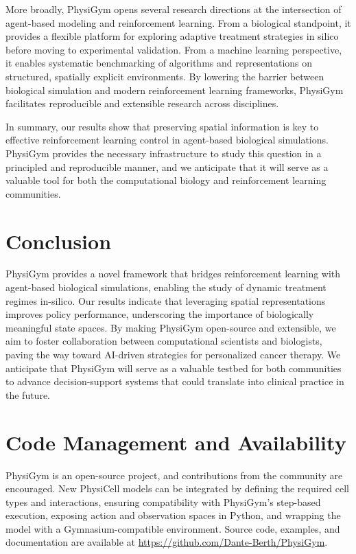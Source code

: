 \documentclass{article}
\begin{document}
More broadly, PhysiGym opens several research directions at the intersection of agent-based modeling and reinforcement learning. From a biological standpoint, it provides a flexible platform for exploring adaptive treatment strategies in silico before moving to experimental validation. From a machine learning perspective, it enables systematic benchmarking of algorithms and representations on structured, spatially explicit environments. By lowering the barrier between biological simulation and modern reinforcement learning frameworks, PhysiGym facilitates reproducible and extensible research across disciplines.

In summary, our results show that preserving spatial information is key to effective reinforcement learning control in agent-based biological simulations. PhysiGym provides the necessary infrastructure to study this question in a principled and reproducible manner, and we anticipate that it will serve as a valuable tool for both the computational biology and reinforcement learning communities.

\section{Conclusion}
PhysiGym provides a novel framework that bridges reinforcement learning with agent-based biological simulations, enabling the study of dynamic treatment regimes in-silico. Our results indicate that leveraging spatial representations improves policy performance, underscoring the importance of biologically meaningful state spaces. By making PhysiGym open-source and extensible, we aim to foster collaboration between computational scientists and biologists, paving the way toward AI-driven strategies for personalized cancer therapy. We anticipate that PhysiGym will serve as a valuable testbed for both communities to advance decision-support systems that could translate into clinical practice in the future.


\section{Code Management and Availability}
PhysiGym is an open-source project, and contributions from the community are encouraged. 
New PhysiCell models can be integrated by defining the required cell types and interactions, ensuring compatibility with PhysiGym’s step-based execution, exposing action and observation spaces in Python, and wrapping the model with a Gymnasium-compatible environment. 
Source code, examples, and documentation are available at \url{https://github.com/Dante-Berth/PhysiGym}.
\end{document}
